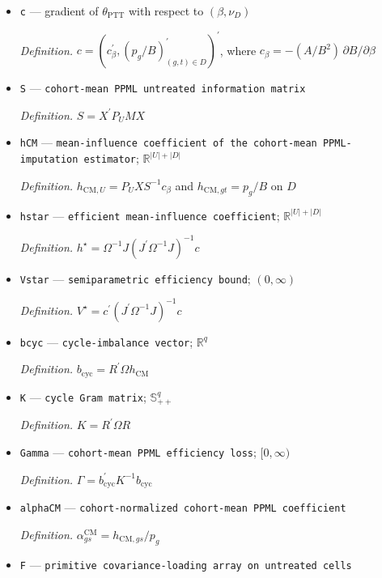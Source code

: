 \documentclass{article}
\begin{document}
\begin{itemize}
  \item \texttt{c} --- gradient of \(\theta_{\mathrm{PTT}}\) with respect to \((\beta,\nu_D)\)
  \par\smallskip\noindent\emph{Definition.} \(c=(c_{\beta}^{\prime},(p_g/B)_{(g,t)\in D}^{\prime})^{\prime}\), where \(c_{\beta}=-(A/B^2)\,\partial B/\partial\beta\)
  \item \texttt{S} --- \texttt{cohort-\allowbreak{}mean PPML untreated information matrix}
  \par\smallskip\noindent\emph{Definition.} \(S=X^{\prime}P_UMX\)
  \item \texttt{hCM} --- \texttt{mean-\allowbreak{}influence coefficient of the cohort-\allowbreak{}mean PPML-\allowbreak{}imputation estimator}; \(\mathbb R^{|U|+|D|}\)
  \par\smallskip\noindent\emph{Definition.} \(h_{\mathrm{CM},U}=P_UXS^{-1}c_{\beta}\) and \(h_{\mathrm{CM},gt}=p_g/B\) on \(D\)
  \item \texttt{hstar} --- \texttt{efficient mean-\allowbreak{}influence coefficient}; \(\mathbb R^{|U|+|D|}\)
  \par\smallskip\noindent\emph{Definition.} \(h^{\star}=\Omega^{-1}J(J^{\prime}\Omega^{-1}J)^{-1}c\)
  \item \texttt{Vstar} --- \texttt{semiparametric efficiency bound}; \((0,\infty)\)
  \par\smallskip\noindent\emph{Definition.} \(V^{\star}=c^{\prime}(J^{\prime}\Omega^{-1}J)^{-1}c\)
  \item \texttt{bcyc} --- \texttt{cycle-\allowbreak{}imbalance vector}; \(\mathbb R^q\)
  \par\smallskip\noindent\emph{Definition.} \(b_{\mathrm{cyc}}=R^{\prime}\Omega h_{\mathrm{CM}}\)
  \item \texttt{K} --- \texttt{cycle Gram matrix}; \(\mathbb S_{++}^q\)
  \par\smallskip\noindent\emph{Definition.} \(K=R^{\prime}\Omega R\)
  \item \texttt{Gamma} --- \texttt{cohort-\allowbreak{}mean PPML efficiency loss}; \([0,\infty)\)
  \par\smallskip\noindent\emph{Definition.} \(\Gamma=b_{\mathrm{cyc}}^{\prime}K^{-1}b_{\mathrm{cyc}}\)
  \item \texttt{alphaCM} --- \texttt{cohort-\allowbreak{}normalized cohort-\allowbreak{}mean PPML coefficient}
  \par\smallskip\noindent\emph{Definition.} \(\alpha^{\mathrm{CM}}_{gs}=h_{\mathrm{CM},gs}/p_g\)
  \item \texttt{F} --- \texttt{primitive covariance-\allowbreak{}loading array on untreated cells}

\end{itemize}
\end{document}
